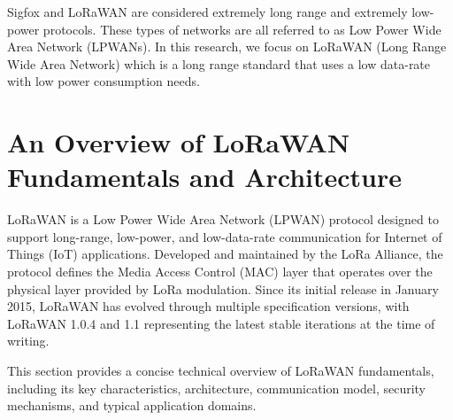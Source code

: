 Sigfox and LoRaWAN are considered extremely long range and extremely low-power protocols. These types of networks are all referred to as Low Power
Wide Area Network (LPWANs). In this research, we focus on LoRaWAN (Long Range Wide Area Network) which is a long range
standard that uses a low data-rate with low power consumption needs.

\section{An Overview of LoRaWAN Fundamentals and Architecture}

LoRaWAN is a Low Power Wide Area Network (LPWAN) protocol designed to support long-range, low-power, and low-data-rate communication for Internet of Things (IoT) applications. Developed and maintained by the LoRa Alliance, the protocol defines the Media Access Control (MAC) layer that operates over the physical layer provided by LoRa modulation. Since its initial release in January 2015, LoRaWAN has evolved through multiple specification versions, with LoRaWAN 1.0.4 and 1.1 representing the latest stable iterations at the time of writing.

This section provides a concise technical overview of LoRaWAN fundamentals, including its key characteristics, architecture, communication model, security mechanisms, and typical application domains.


